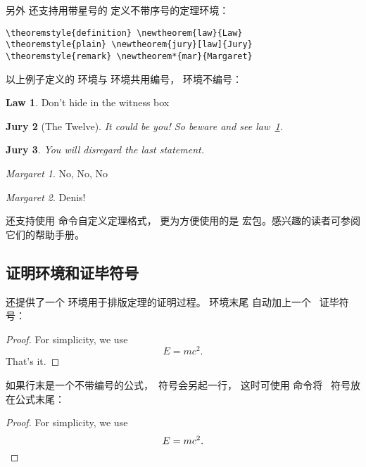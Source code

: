 另外  还支持用带星号的  定义不带序号的定理环境：
\begin{verbatim}
\theoremstyle{definition} \newtheorem{law}{Law}
\theoremstyle{plain} \newtheorem{jury}[law]{Jury}
\theoremstyle{remark} \newtheorem*{mar}{Margaret}
\end{verbatim}
\theoremstyle{definition} \newtheorem{law}{Law}
\theoremstyle{plain} \newtheorem{jury}[law]{Jury}
\theoremstyle{remark} \newtheorem*{mar}{Margaret}

以上例子定义的  环境与  环境共用编号， 环境不编号：
\begin{example}
\begin{law} \label{law:box}
Don’t hide in the witness box
\end{law}
\begin{jury}[The Twelve]
It could be you! So beware and
see law~\ref{law:box}.\end{jury}
\begin{jury}
You will disregard the last
statement.\end{jury}
\begin{mar}No, No, No\end{mar}
\begin{mar}Denis!\end{mar}
\end{example}

 还支持使用  命令自定义定理格式，
更为方便使用的是  宏包。感兴趣的读者可参阅它们的帮助手册。

\subsection{证明环境和证毕符号}

 还提供了一个  环境用于排版定理的证明过程。 环境末尾
自动加上一个 \qedsymbol\ 证毕符号：
\begin{example}
\begin{proof}
For simplicity, we use
\[
E=mc^2.
\]
That's it.
\end{proof}
\end{example}

如果行末是一个不带编号的公式，\qedsymbol\ 符号会另起一行，
这时可使用  命令将 \qedsymbol\ 符号放在公式末尾：
\begin{example}
\begin{proof}
For simplicity, we use
\[
E=mc^2.\qedhere
\]
\end{proof}
\end{example}

